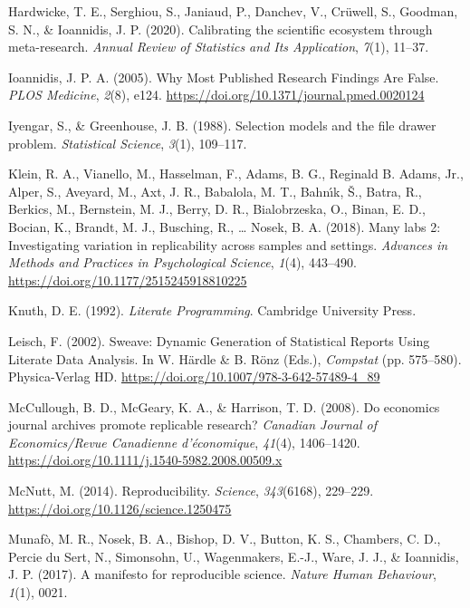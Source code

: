 \documentclass[
  a4paper,
]{article}
\newlength{\cslhangindent}
\newenvironment{CSLReferences}[2] %
 {\begin{list}{}{%
  \setlength{\itemindent}{0pt}
  \setlength{\leftmargin}{0pt}
  \setlength{\parsep}{0pt}
  \ifodd #1
   \setlength{\leftmargin}{\cslhangindent}
   \setlength{\itemindent}{-1\cslhangindent}
  \fi
  \setlength{\itemsep}{#2\baselineskip}}}
 {\end{list}}
\begin{document}
\begin{CSLReferences}{1}{0}
Hardwicke, T. E., Serghiou, S., Janiaud, P., Danchev, V., Crüwell, S.,
Goodman, S. N., \& Ioannidis, J. P. (2020). Calibrating the scientific
ecosystem through meta-research. \emph{Annual Review of Statistics and
Its Application}, \emph{7}(1), 11--37.

Ioannidis, J. P. A. (2005). Why {Most Published Research Findings Are
False}. \emph{PLOS Medicine}, \emph{2}(8), e124.
\url{https://doi.org/10.1371/journal.pmed.0020124}

Iyengar, S., \& Greenhouse, J. B. (1988). Selection models and the file
drawer problem. \emph{Statistical Science}, \emph{3}(1), 109--117.

Klein, R. A., Vianello, M., Hasselman, F., Adams, B. G., Reginald B.
Adams, Jr., Alper, S., Aveyard, M., Axt, J. R., Babalola, M. T., Bahnı́k,
Š., Batra, R., Berkics, M., Bernstein, M. J., Berry, D. R.,
Bialobrzeska, O., Binan, E. D., Bocian, K., Brandt, M. J., Busching, R.,
\ldots{} Nosek, B. A. (2018). Many labs 2: {Investigating} variation in
replicability across samples and settings. \emph{Advances in Methods and
Practices in Psychological Science}, \emph{1}(4), 443--490.
\url{https://doi.org/10.1177/2515245918810225}

Knuth, D. E. (1992). \emph{Literate {Programming}}. {Cambridge
University Press}.

Leisch, F. (2002). Sweave: {Dynamic Generation} of {Statistical Reports
Using Literate Data Analysis}. In W. Härdle \& B. Rönz (Eds.),
\emph{Compstat} (pp. 575--580). {Physica-Verlag HD}.
\url{https://doi.org/10.1007/978-3-642-57489-4_89}

McCullough, B. D., McGeary, K. A., \& Harrison, T. D. (2008). Do
economics journal archives promote replicable research? \emph{Canadian
Journal of Economics/Revue Canadienne d'économique}, \emph{41}(4),
1406--1420. \url{https://doi.org/10.1111/j.1540-5982.2008.00509.x}

McNutt, M. (2014). Reproducibility. \emph{Science}, \emph{343}(6168),
229--229. \url{https://doi.org/10.1126/science.1250475}

Munafò, M. R., Nosek, B. A., Bishop, D. V., Button, K. S., Chambers, C.
D., Percie du Sert, N., Simonsohn, U., Wagenmakers, E.-J., Ware, J. J.,
\& Ioannidis, J. P. (2017). A manifesto for reproducible science.
\emph{Nature Human Behaviour}, \emph{1}(1), 0021.


\end{CSLReferences}
\end{document}

